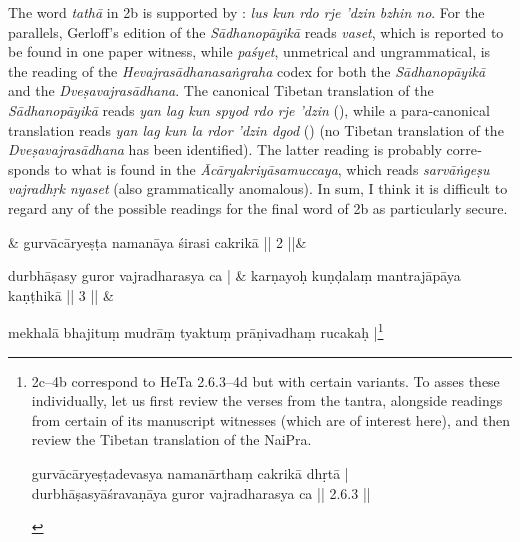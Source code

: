 \documentclass[naipra.tex]{subfiles}
\begin{document}
\begin{sanskrit}
{\begin{english}
		The word \emph{tathā} in 2b is supported by \TIB : \emph{lus kun rdo rje 'dzin bzhin no}.
		For the parallels, Gerloff's edition of the \emph{Sādhanopāyikā} reads \emph{vaset}, which is reported to be found in one paper witness, while \emph{paśyet}, unmetrical and ungrammatical, is the reading of the \emph{Hevajrasādhanasaṅgraha} codex for both the \emph{Sādhanopāyikā} and the \emph{Dveṣavajrasādhana}.
		The canonical Tibetan translation of the \emph{Sādhanopāyikā} reads \emph{yan lag kun spyod rdo rje 'dzin} (\cite[vol.\ 1 135]{gerloff2020}), while a para-canonical translation reads \emph{yan lag kun la rdor 'dzin dgod} (\cite[vol.\ 2 152]{gerloff2020}) (no Tibetan translation of the \emph{Dveṣavajrasādhana} has been identified).
		The latter reading is probably corresponds to what is found in the \emph{Ācāryakriyāsamuccaya}, which reads \emph{sarvāṅgeṣu vajradhṛk nyaset} (also grammatically anomalous).
		In sum, I think it is difficult to regard any of the possible readings for the final word of 2b as particularly secure.
	\label{2bnote}
\end{english}} & 
gurvācāryeṣṭa namanāya śirasi cakrikā || 2 ||\&


\medskip\versequote
durbhāṣasy guror vajradharasya ca | &
karṇayoḥ kuṇḍalaṃ  mantrajāpāya kaṇṭhikā || 3 || \& 


\medskip\versequote 
mekhalā bhajituṃ mudrāṃ tyaktuṃ prāṇivadhaṃ rucakaḥ |\footnote{
	\begin{english}%
		2c–4b correspond to HeTa 2.6.3–4d but with certain variants.
		To asses these individually, let us first review the verses from the tantra, alongside readings from certain of its manuscript witnesses (which are of interest here), and then review the Tibetan translation of the NaiPra.

		\begin{prosequote}%
			gurvācāryeṣṭadevasya namanārthaṃ cakrikā dhṛtā |\\
			durbhāṣasyāśravaṇāya guror vajradharasya ca || 2.6.3 ||
			\medskip	


\end{prosequote}
\end{english}}
\end{sanskrit}
\end{document}
